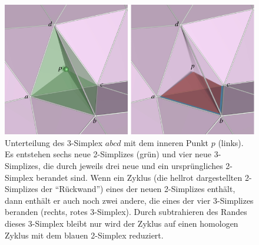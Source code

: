 %
%
%
\begin{figure}
\centering
\includegraphics{chapters/120-topologie/images/zyklus.pdf}
\caption{Unterteilung des 3-Simplex $abcd$ mit dem inneren Punkt $p$
(links).
Es entstehen sechs neue 2-Simplizes ({\color{darkgreen}grün}) und vier
neue 3-Simplizes, die durch jeweils drei neue und ein ursprüngliches
2-Simplex berandet sind.
Wenn ein Zyklus (die hellrot dargestellten 2-Simplizes der ``Rückwand'')
eines der neuen 2-Simplizes enthält, dann enthält
er auch noch zwei andere, die eines der vier 3-Simplizes beranden
(rechts, rotes 3-Simplex).
Durch subtrahieren des Randes dieses 3-Simplex bleibt nur
wird der Zyklus auf einen homologen Zyklus mit dem blauen 2-Simplex
reduziert.
\label{buch:topologie:simplex:fig:zyklus}}
\end{figure}
